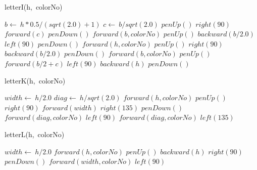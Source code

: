 \documentclass[a4paper,10pt]{article}
\begin{document}
\begin{algorithm}
\caption{letterI(h,\ colorNo)}
\begin{algorithmic}[5]

\STATE {}
\STATE {}
  \STATE \(b\gets\ h*0.5/(sqrt(2.0)+1)\)
  \STATE \(c\gets\ b/sqrt(2.0)\)
  \STATE \(penUp()\)
  \STATE \(right(90)\)
  \STATE \(forward(c)\)
  \STATE \(penDown()\)
  \STATE \(forward(b,colorNo)\)
  \STATE \(penUp()\)
  \STATE \(backward(b/2.0)\)
  \STATE \(left(90)\)
  \STATE \(penDown()\)
  \STATE \(forward(h,colorNo)\)
  \STATE \(penUp()\)
  \STATE \(right(90)\)
  \STATE \(backward(b/2.0)\)
  \STATE \(penDown()\)
  \STATE \(forward(b,colorNo)\)
  \STATE \(penUp()\)
  \STATE \(forward(b/2+c)\)
  \STATE \(left(90)\)
  \STATE \(backward(h)\)
  \STATE \(penDown()\)

\end{algorithmic}
\end{algorithm}


\begin{algorithm}
\caption{letterK(h,\ colorNo)}
\begin{algorithmic}[5]

\STATE {}
\STATE {}
  \STATE \(width\gets\ h/2.0\)
  \STATE \(diag\gets\ h/sqrt(2.0)\)
  \STATE \(forward(h,colorNo)\)
  \STATE \(penUp()\)
  \STATE \(right(90)\)
  \STATE \(forward(width)\)
  \STATE \(right(135)\)
  \STATE \(penDown()\)
  \STATE \(forward(diag,colorNo)\)
  \STATE \(left(90)\)
  \STATE \(forward(diag,colorNo)\)
  \STATE \(left(135)\)

\end{algorithmic}
\end{algorithm}


\begin{algorithm}
\caption{letterL(h,\ colorNo)}
\begin{algorithmic}[5]

\STATE {}
\STATE {}
  \STATE \(width\gets\ h/2.0\)
  \STATE \(forward(h,colorNo)\)
  \STATE \(penUp()\)
  \STATE \(backward(h)\)
  \STATE \(right(90)\)
  \STATE \(penDown()\)
  \STATE \(forward(width,colorNo)\)
  \STATE \(left(90)\)

\end{algorithmic}
\end{algorithm}
\end{document}
